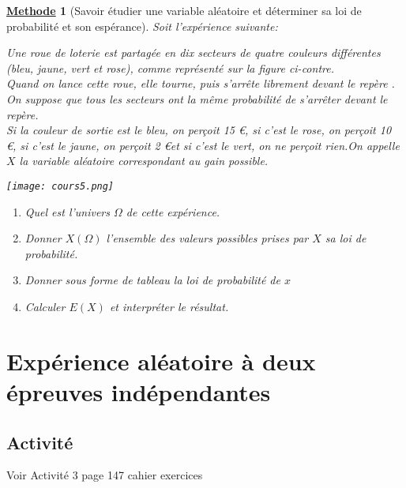 \documentclass[10pt,a4paper]{article}
\theoremstyle{break}
\newtheorem{Meth}{\underline{Methode}}
\begin{document}
		\begin{Meth}[Savoir étudier une variable aléatoire et déterminer sa loi de probabilité et son espérance]
	Soit l'expérience suivante: \\
		\begin{minipage}{0.6\textwidth}
			Une roue de loterie est partagée en dix secteurs de quatre couleurs différentes (bleu, jaune, vert et rose), comme représenté sur la figure ci-contre.\\ Quand on lance cette roue, elle tourne, puis s'arrête librement devant le repère . On suppose que tous les secteurs ont la même probabilité de s'arrêter devant le repère.\\
			Si la couleur de sortie est le bleu, on perçoit 15 \euro, si c'est le rose, on perçoit 10 \euro, si c'est le jaune, on perçoit 2 \euro et si c'est le vert, on ne perçoit rien.On appelle $X$ la variable aléatoire correspondant au gain possible. 
		\end{minipage} 
		\begin{minipage}{0.4\textwidth}
			\texttt{[image: cours5.png]}
		\end{minipage}
	\begin{enumerate}
		\item 	Quel est  l'univers $\Omega$ de cette expérience.
		\item Donner $X(\Omega)$ l'ensemble des valeurs possibles prises par $X$ sa loi de probabilité.
		\item Donner sous forme de tableau la loi de probabilité de $x$
		\item Calculer $E(X)$ et interpréter le résultat.
	\end{enumerate}	

	
\end{Meth}
	\section{Expérience aléatoire à deux épreuves indépendantes}
	\subsection{Activité}
Voir Activité 3 page 147 cahier exercices
\end{document}
